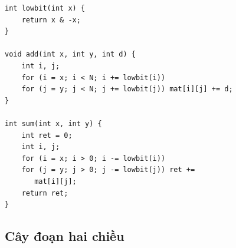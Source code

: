 \documentclass[11pt]{article}
\begin{document}
\begingroup
\footnotesize
\begin{verbatim}
int lowbit(int x) {
    return x & -x;
}

void add(int x, int y, int d) {
    int i, j;
    for (i = x; i < N; i += lowbit(i))
    for (j = y; j < N; j += lowbit(j)) mat[i][j] += d;
}

int sum(int x, int y) {
    int ret = 0;
    int i, j;
    for (i = x; i > 0; i -= lowbit(i))
    for (j = y; j > 0; j -= lowbit(j)) ret +=
       mat[i][j];
    return ret;
}
\end{verbatim}
\endgroup

\subsection{Cây đoạn hai chiều}

\begingroup
\footnotesize
\end{document}
